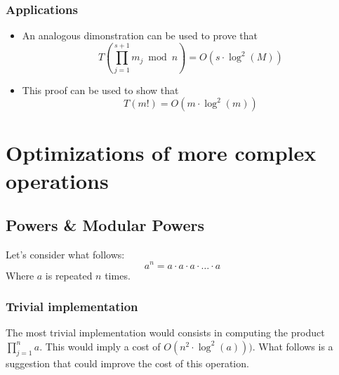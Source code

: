 \subsubsection{Applications}
\begin{itemize}
    \item An analogous dimonstration can be used to prove that \[T(\prod_{j = 1}^{s+1} m_{j} \bmod n) = O(s \cdot \operatorname{log}^{2}(M))\]
    \item This proof can be used to show that \[T(m!) = O(m \cdot \operatorname{log}^{2}(m))\]
\end{itemize}

\section{Optimizations of more complex operations}
\subsection{Powers \& Modular Powers}
Let's consider what follows: \[a^n = a \cdot a \cdot a \cdot \dots \cdot a\]
Where $a$ is repeated $n$ times.
\subsubsection{Trivial implementation}
The most trivial implementation would consists in computing the product $\prod_{j = 1}^{n} a$. This would imply a cost of $O(n^{2} \cdot \operatorname{log}^{2}(a)))$.\newline
What follows is a suggestion that could improve the cost of this operation.
